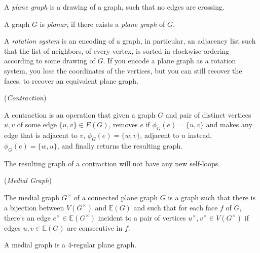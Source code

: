 \documentclass{article}
\begin{document}
	A \textit{plane graph} is a drawing of a graph, such that no edges are crossing.
	
	A graph $G$ is \textit{planar}, if there exists a \textit{plane graph} of $G$.

	A \textit{rotation system} is an encoding of a graph, in particular, an adjacency list such that the list of neighbors, of every vertex, is sorted in clockwise ordering according to some drawing of $G$. If you encode a plane graph as a rotation system, you lose the coordinates of the vertices, but you can still recover the faces, to recover an equivalent plane graph.

	\begin{definition}\label{def:contraction}
		(\textit{Contraction})

		A contraction is an operation that given a graph $G$ and pair of distinct vertices $u,v$ of some edge $\{u,v\} \in E(G)$, removes $e$ if $\phi_G(e) = \{u,v\}$ and makes any edge that is adjacent to $v$, $\phi_G(e) = \{w,v\}$, adjacent to $u$ instead, $\phi_G(e) = \{w,u\}$, and finally returns the resulting graph.
	\end{definition}

	\begin{corollary}
		The resulting graph of a contraction will not have any new self-loops.
	\end{corollary}

	\begin{center}
		
	\end{center}
	
	\begin{definition}\label{def:medial}
		(\textit{Medial Graph})
		
		The medial graph $G^\times$ of a connected plane graph $G$ is a graph such that there is a bijection between $V(G^\times)$ and $\mathbb{E}(G)$ and such that for each face $f$ of $G$, there's an edge $e^\times \in \mathbb{E}(G^\times)$ incident to a pair of vertices $u^\times,v^\times \in V(G^\times)$ if edges $u,v \in \mathbb{E}(G)$ are consecutive in $f$.
	\end{definition}

	\begin{center}
		
	\end{center}
	
	\begin{corollary}
		A medial graph is a 4-regular plane graph.
	\end{corollary}
\end{document}

